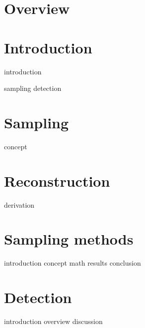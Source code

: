 \documentclass[a4paper, openany, oneside]{memoir}
\begin{document}
\chapter{Overview}

\chapter{Introduction}
{introduction}

{sampling}
{detection}


\chapter{Sampling}

{concept}

\chapter{Reconstruction}

{derivation}

\chapter{Sampling methods}

{introduction}
{concept}
{math} 
{results}
{conclusion}


\chapter{Detection}

{introduction}
{overview}
{discussion}
\end{document}
